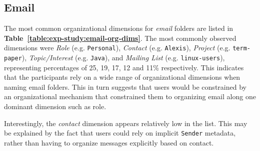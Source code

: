 \subsection{Email}


The most common organizational dimensions for \textit{email} folders are listed in \textbf{Table~\ref{table:exp-study:email-org-dims}}.
The most commonly observed dimensions were \textit{Role} (e.g. \texttt{Personal}), \textit{Contact} (e.g. \texttt{Alexis}), \textit{Project} (e.g. \texttt{term-paper}), \textit{Topic/Interest} (e.g. \texttt{Java}), and \textit{Mailing List} (e.g. \texttt{linux-users}), representing percentages of 25, 19, 17, 12 and 11\% respectively. This indicates that the participants rely on a wide range of organizational dimensions when naming email folders. This in turn suggests that  users would be constrained by an organizational mechanism that constrained them to organizing email along one dominant dimension such as role.

Interestingly, the \textit{contact} dimension appears relatively low in the list. This may be explained by the fact that users could rely on implicit \texttt{Sender} metadata, rather than having to organize messages explicitly based on contact.


